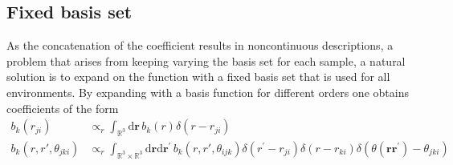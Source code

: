 \subsection{Fixed basis set}
As the concatenation of the coefficient results in noncontinuous descriptions, a problem that arises from keeping varying the basis set for each sample, a natural solution is to expand on the function with a fixed basis set that is used for all environments\cite{behler2011atom,bartok2013representing,drautz2019atomic}.
By expanding with a basis function for different orders one obtains coefficients of the form
\begin{subequations}
\label{eq:dirac_delta_expansion_coeffs}
\begin{align}
    \label{eq:dirac_delta_expansion_coeffs_2body}
    b_k(r_{ji}) &\propto_r\int_{\mathbb{R}^3}\mathrm{d}\mathbf{r}\, b_k(r)\delta(r-r_{ji})\\
    \label{eq:dirac_delta_expansion_coeffs_3body}
    b_k(r,r\prime,\theta_{jki})&\propto_r\int_{\mathbb{R}^3\times\mathbb{R}^3}\mathrm{d}\mathbf{r}\mathrm{d}\mathbf{r}^\prime\, b_k(r,r\prime,\theta_{ijk})\delta(r^\prime-r_{ji})\delta(r-r_{ki})
    \delta(\theta(\mathbf{r}\mathbf{r}^\prime) - \theta_{jki}) 
\end{align}
\end{subequations}
%
